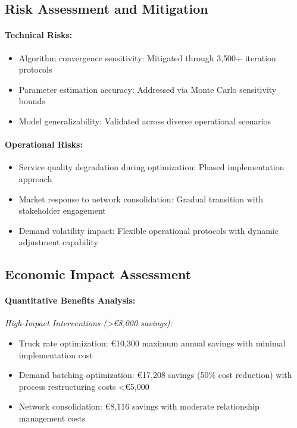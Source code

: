 \documentclass[12pt,a4paper]{article}
\begin{document}
\subsection{Risk Assessment and Mitigation}

\paragraph{Technical Risks:}
\begin{itemize}
    \item Algorithm convergence sensitivity: Mitigated through 3,500+ iteration protocols
    \item Parameter estimation accuracy: Addressed via Monte Carlo sensitivity bounds
    \item Model generalizability: Validated across diverse operational scenarios
\end{itemize}

\paragraph{Operational Risks:}
\begin{itemize}
    \item Service quality degradation during optimization: Phased implementation approach
    \item Market response to network consolidation: Gradual transition with stakeholder engagement
    \item Demand volatility impact: Flexible operational protocols with dynamic adjustment capability
\end{itemize}

\subsection{Economic Impact Assessment}

\paragraph{Quantitative Benefits Analysis:}

\textit{High-Impact Interventions (>€8,000 savings):}
\begin{itemize}
    \item Truck rate optimization: €10,300 maximum annual savings with minimal implementation cost
    \item Demand batching optimization: €17,208 savings (50\% cost reduction) with process restructuring costs <€5,000
    \item Network consolidation: €8,116 savings with moderate relationship management costs
\end{itemize}
\end{document}
